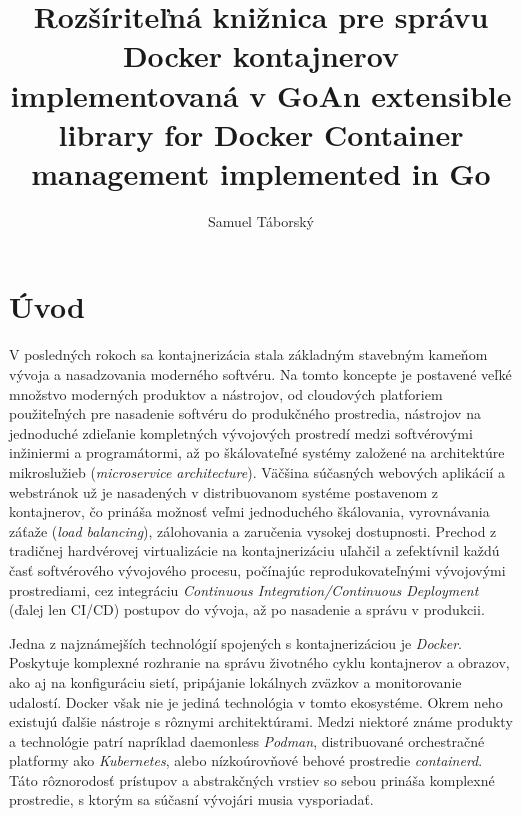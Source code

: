 \documentclass[
 program=infpvs,
  language=slovak,
  figures=false,
  tables=false,
  sourcecodes,
  glossaries,
  index
]{kidiplom}
\title{Rozšíriteľná knižnica pre správu Docker kontajnerov implementovaná v Go}
\title[english]{An extensible library for Docker Container management implemented in Go}
\author{Samuel Táborský}
\begin{document}
\maketitle





\section{Úvod} \label{sec:uvod}
V posledných rokoch sa kontajnerizácia stala základným stavebným kameňom vývoja a nasadzovania moderného softvéru. Na tomto koncepte je postavené veľké množstvo moderných produktov a nástrojov, od cloudových platforiem použiteľných pre nasadenie softvéru do produkčného prostredia, nástrojov na jednoduché zdieľanie kompletných vývojových prostredí medzi softvérovými inžiniermi a programátormi, až po škálovateľné systémy založené na architektúre mikroslužieb (\textit{microservice architecture}). Väčšina súčasných webových aplikácií a webstránok už je nasadených v distribuovanom systéme postavenom z kontajnerov, čo prináša možnosť veľmi jednoduchého škálovania, vyrovnávania záťaže (\textit{load balancing}), zálohovania a zaručenia vysokej dostupnosti. Prechod z tradičnej hardvérovej virtualizácie na kontajnerizáciu uľahčil a zefektívnil každú časť softvérového vývojového procesu, počínajúc reprodukovateľnými vývojovými prostrediami, cez integráciu \textit{Continuous Integration/Continuous Deployment} (ďalej len CI/CD) postupov do vývoja, až po nasadenie a správu v produkcii.

Jedna z najznámejších technológií spojených s kontajnerizáciou je \textit{Docker}. Poskytuje komplexné rozhranie na správu životného cyklu kontajnerov a obrazov, ako aj na konfiguráciu sietí, pripájanie lokálnych zväzkov a monitorovanie udalostí. Docker však nie je jediná technológia v tomto ekosystéme. Okrem neho existujú ďalšie nástroje s rôznymi architektúrami. Medzi niektoré známe produkty a technológie patrí napríklad daemonless \textit{Podman}, distribuované orchestračné platformy ako \textit{Kubernetes}, alebo nízkoúrovňové behové prostredie \textit{containerd}. Táto rôznorodosť prístupov a abstrakčných vrstiev so sebou prináša komplexné prostredie, s ktorým sa súčasní vývojári musia vysporiadať.
\end{document}
